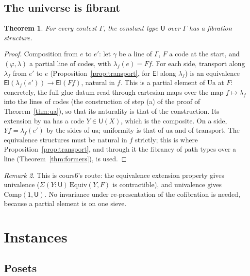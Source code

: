\documentclass[11pt]{article}
\newcommand{\U}{\mathsf{U}}
\newcommand{\El}{\mathsf{El}}
\newcommand{\Comp}{\mathrm{Comp}}
\newcommand{\Equiv}{\mathrm{Equiv}}
\newcommand{\Ua}{\mathrm{Ua}}
\newcommand{\ua}{\mathrm{ua}}
\theoremstyle{plain}
\newtheorem{theorem}{Theorem}[section]
\theoremstyle{definition}
\theoremstyle{remark}
\newtheorem{remark}[theorem]{Remark}
\begin{document}
\subsection{The universe is fibrant}

\begin{theorem}\label{thm:fibU}
For every context $\Gamma$, the constant type $\U$ over $\Gamma$ has a
fibration structure.
\end{theorem}

\begin{proof}
Composition from $e$ to $e'$: let $\gamma$ be a line of $\Gamma$, $F$ a
code at the start, and $(\varphi,\lambda)$ a partial line of codes, with
$\lambda_f(e)=Ff$. For each side, transport along $\lambda_f$ from $e'$
to $e$ (Proposition~\ref{prop:transport}, for $\El$ along $\lambda_f$)
is an equivalence $\El(\lambda_f(e'))\to\El(Ff)$, natural in $f$. This
is a partial element of $\Ua$ at $F$: concretely, the full glue datum
read through cartesian maps over the map $f\mapsto\lambda_f$ into the
lines of codes (the construction of step (a) of the proof of
Theorem~\ref{thm:ua}), so that its naturality is that of the
construction. Its extension by $\ua$ has a code
$Y\in\U(X)$, which is the composite. On a side, $Yf=\lambda_f(e')$ by
the sides of $\ua$; uniformity is that of $\ua$ and of transport. The
equivalence structures must be natural in $f$ strictly; this is where
Proposition~\ref{prop:transport}, and through it the fibrancy of path
types over a line (Theorem~\ref{thm:formers}), is used.
\end{proof}

\begin{remark}
This is cours6's route: the equivalence extension property gives
univalence ($\Sigma(Y:\U)\,\Equiv(Y,F)$ is contractible), and univalence
gives $\Comp(1,\U)$. No invariance under re-presentation of the
cofibration is needed, because a partial element is on one sieve.
\end{remark}

\section{Instances}\label{sec:inst}

\subsection{Posets}\label{sec:posets}
\end{document}
